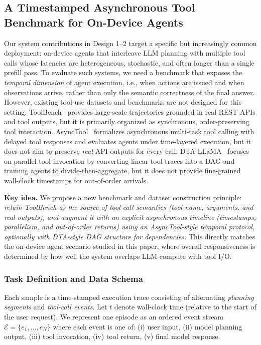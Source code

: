 
\subsection{A Timestamped Asynchronous Tool Benchmark for On-Device Agents}
Our system contributions in Design 1--2 target a specific but increasingly common deployment: on-device agents that interleave LLM planning with multiple tool calls whose latencies are heterogeneous, stochastic, and often longer than a single prefill pass.
To evaluate such systems, we need a benchmark that exposes the \emph{temporal dimension} of agent execution, i.e., when actions are issued and when observations arrive, rather than only the semantic correctness of the final answer.
However, existing tool-use datasets and benchmarks are not designed for this setting.
ToolBench~\cite{qin2023toolllm} provides large-scale trajectories grounded in real REST APIs and tool outputs, but it is primarily organized as synchronous, order-preserving tool interaction.
AsyncTool~\cite{shi2026asynctool} formalizes asynchronous multi-task tool calling with delayed tool responses and evaluates agents under time-layered execution, but it does not aim to preserve \emph{real} API outputs for every call.
DTA-LLaMA~\cite{zhu2025divideThenAggregate} focuses on parallel tool invocation by converting linear tool traces into a DAG and training agents to divide-then-aggregate, but it does not provide fine-grained wall-clock timestamps for out-of-order arrivals.

\textbf{Key idea.}
We propose a new benchmark and dataset construction principle: \emph{retain ToolBench as the source of tool-call semantics (tool name, arguments, and real outputs), and augment it with an explicit asynchronous timeline (timestamps, parallelism, and out-of-order returns) using an AsyncTool-style temporal protocol, optionally with DTA-style DAG structure for dependencies.}
This directly matches the on-device agent scenario studied in this paper, where overall responsiveness is determined by how well the system overlaps LLM compute with tool I/O.

\subsubsection{Task Definition and Data Schema}
Each sample is a time-stamped execution trace consisting of alternating \emph{planning segments} and \emph{tool-call events}.
Let $t$ denote wall-clock time (relative to the start of the user request).
We represent one episode as an ordered event stream $\mathcal{E} = \{e_1,\ldots,e_N\}$ where each event is one of:
(i) user input, (ii) model planning output, (iii) tool invocation, (iv) tool return, (v) final model response.

